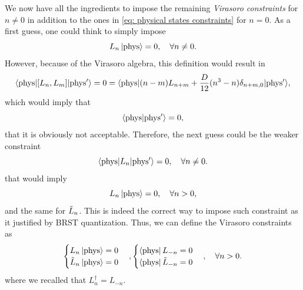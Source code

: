 We now have all the ingredients to impose the remaining \emph{Virasoro constraints} for $n \neq 0$ in addition to the ones in \eqref{eq: physical states constraints} for $n = 0$. As a first guess, one could think to simply impose 
\begin{equation}
    L_n\ket{\mathrm{phys}} = 0,\quad \forall n \neq 0.
\end{equation}
However, because of the Virasoro algebra, this definition would result in 
\begin{equation}
    \langle \mathrm{phys} | [L_n,L_m] | \mathrm{phys'} \rangle = 0 = \langle \mathrm{phys} | (n - m)L_{n + m} + \frac{D}{12}(n^3 - n)\delta_{n + m,0} | \mathrm{phys'} \rangle,
\end{equation}
which would imply that 
\begin{equation}
    \langle \mathrm{phys} | \mathrm{phys'} \rangle = 0,
\end{equation}
that it is obviously not acceptable. Therefore, the next guess could be the weaker constraint 
\begin{equation}
    \langle \mathrm{phys} | L_n | \mathrm{phys'} \rangle = 0,\quad\forall n \neq 0.
\end{equation}
that would imply 
\begin{equation}
    L_n\ket{\mathrm{phys}} = 0,\quad \forall n > 0,
\end{equation}
and the same for $\tilde{L}_n$. This is indeed the correct way to impose such constraint as it justified by BRST quantization. Thus, we can define the Virasoro constraints as 
\begin{equation}
\label{eq: Virasoro constraints}
    \begin{cases}
        L_n\ket{\mathrm{phys}} = 0 \\
        \tilde{L}_n\ket{\mathrm{phys}} = 0
    \end{cases},
    \begin{cases}
        \bra{\mathrm{phys}}L_{-n} = 0 \\
        \bra{\mathrm{phys}}\tilde{L}_{-n} = 0
    \end{cases},\quad \forall n > 0.
\end{equation}
where we recalled that $L_n^\dag = L_{-n}$.

